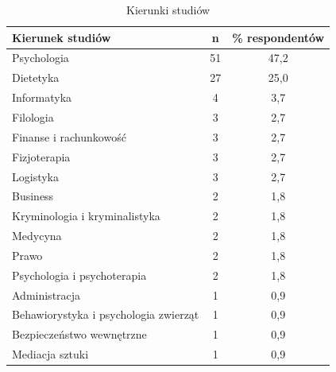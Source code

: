 
\begin{table}[H]
    \centering
    \caption{Kierunki studiów}
    \label{tab:kierunki-studiow}
    \begin{tabular}{|l|c|c|}
        \hline
        \textbf{Kierunek studiów} & \textbf{n} & \textbf{\% respondentów} \\
        \hline
        \hline
        Psychologia & 51 & 47,2 \\
        \hline
        Dietetyka & 27 & 25,0 \\
        \hline
        Informatyka & 4 & 3,7 \\
        \hline
        Filologia & 3 & 2,7 \\
        \hline
        Finanse i rachunkowość & 3 & 2,7 \\
        \hline
        Fizjoterapia & 3 & 2,7 \\
        \hline
        Logistyka & 3 & 2,7 \\
        \hline
        Business & 2 & 1,8\\
        \hline
        Kryminologia i kryminalistyka & 2 & 1,8 \\
        \hline
        Medycyna & 2 & 1,8 \\
        \hline
        Prawo & 2 & 1,8 \\
        \hline
        Psychologia i psychoterapia & 2 & 1,8 \\
        \hline
        Administracja & 1 & 0,9 \\
        \hline
        Behawiorystyka i psychologia zwierząt & 1 & 0,9 \\
        \hline
        Bezpieczeństwo wewnętrzne & 1 & 0,9 \\
        \hline
        Mediacja sztuki & 1 & 0,9 \\
        \hline
    \end{tabular}
\end{table}


